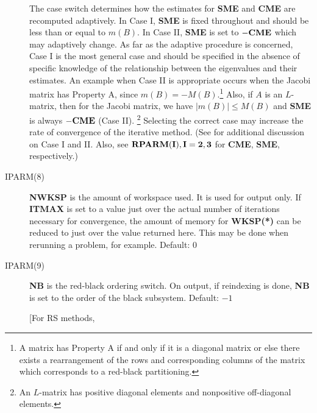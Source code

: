 \begin{description}
                 \noindent
                 The case switch determines how the estimates for 
                 {\bf SME} and {\bf CME} are recomputed adaptively.  In 
                 Case I, {\bf SME} is fixed throughout and should be less 
                 than or equal to $m(B)$.  In Case II, {\bf SME} is set 
                 to ${\bf -CME}$ which may adaptively change.  As far as 
                 the adaptive procedure is concerned, Case I is the most
                 general case and should be specified in the absence of
                 specific knowledge of the relationship between the 
                 eigenvalues and their estimates.  An example when Case II
                 is appropriate occurs when the Jacobi matrix has 
                 Property A, since $m(B) = -M(B)$.\footnote{A matrix has
                 Property A if and only if it is a diagonal matrix or
                 else there exists a rearrangement of the rows and 
                 corresponding columns of the matrix which corresponds to 
                 a red-black partitioning.}  Also, if $A$ is an $L$-matrix, 
                 then for the Jacobi matrix, we have $|m(B)| \leq M(B)$ 
                 and {\bf SME} is always ${\bf -CME}$ (Case II).
                 \footnote{An $L$-matrix has positive diagonal elements
                 and nonpositive off-diagonal elements.} Selecting the
                 correct case may increase the rate of convergence of 
                 the iterative method.  (See \cite{6} for additional
                 discussion on Case I and II.  Also, see 
                 ${\bf RPARM(I), I=2,3}$ for {\bf CME}, {\bf SME}, 
                 respectively.)
 
 \item[IPARM(8)] {\bf NWKSP} is the amount of workspace used.  It is used 
                 for output only.  If {\bf ITMAX} is set to a value just 
                 over the actual number of iterations necessary for 
                 convergence, the amount of memory for {\bf WKSP(*)} can 
                 be reduced to just over the value returned here.  This 
                 may be done when rerunning a problem, for example.  
                 Default: $0$
 
 \item[IPARM(9)] {\bf NB} is the red-black ordering switch.  On output, 
                 if reindexing is done, {\bf NB} is set to the order of 
                 the black subsystem.  Default: $-1$
 
                 \noindent
                 [For RS methods,


\end{description}
